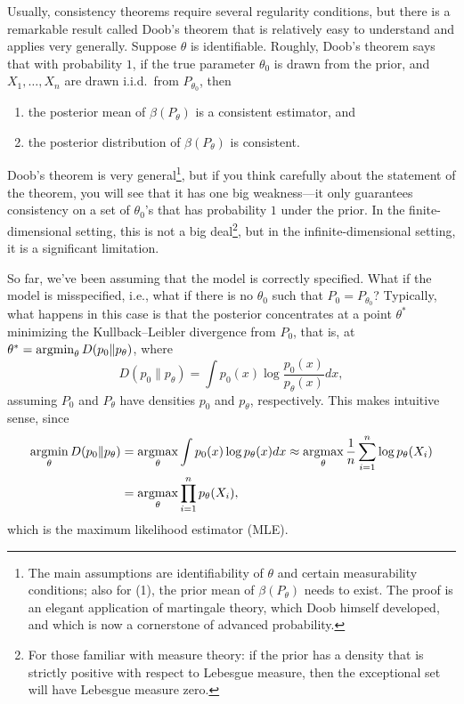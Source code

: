 \documentclass[12pt]{article}
\begin{document}
Usually, consistency theorems require several regularity conditions, but there is a remarkable result called Doob's theorem that is relatively easy to understand and applies very generally. Suppose $\theta$ is identifiable. Roughly, Doob's theorem says that with probability $1$, if the true parameter $\theta_0$ is drawn from the prior, and $X_1,\ldots,X_n$ are drawn i.i.d.\ from $P_{\theta_0}$, then
\begin{enumerate}
\item the posterior mean of $\beta(P_\theta)$ is a consistent estimator, and
\item the posterior distribution of $\beta(P_\theta)$ is consistent.
\end{enumerate}
Doob's theorem is very general\footnote{The main assumptions are identifiability of $\theta$ and certain measurability conditions; also for (1), the prior mean of $\beta(P_\theta)$ needs to exist. The proof is an elegant application of martingale theory, which Doob himself developed, and which is now a cornerstone of advanced probability.}, but if you think carefully about the statement of the theorem, you will see that it has one big weakness---it only guarantees consistency on a set of $\theta_0$'s that has probability $1$ under the prior. In the finite-dimensional setting, this is not a big deal\footnote{For those familiar with measure theory: if the prior has a density that is strictly positive with respect to Lebesgue measure, then the exceptional set will have Lebesgue measure zero.}, but in the infinite-dimensional setting, it is a significant limitation.

So far, we've been assuming that the model is correctly specified. What if the model is misspecified, i.e., what if there is no $\theta_0$ such that $P_0 = P_{\theta_0}$? Typically, what happens in this case is that the posterior concentrates at a point $\theta^*$ minimizing the Kullback--Leibler divergence from $P_0$, that is, at $\theta^*= \operatorname*{argmin}_{\theta} D(p_0 \| p_\theta)$, where
$$ D(p_0 \| p_\theta) = \int p_0(x) \log \frac{p_0(x)}{p_\theta(x)} d x, $$
assuming $P_0$ and $P_\theta$ have densities $p_0$ and $p_\theta$, respectively. This makes intuitive sense, since
\begin{align*}
\operatorname*{argmin}_\theta D(p_0 \| p_\theta) &= \operatorname*{argmax}_\theta \int p_0(x) \log p_\theta(x)d x \approx \operatorname*{argmax}_\theta \frac{1}{n}\sum_{i = 1}^n \log p_\theta(X_i) \\
& = \operatorname*{argmax}_\theta \prod_{i = 1}^n p_\theta(X_i),
\end{align*}
which is the maximum likelihood estimator (MLE).
\end{document}
